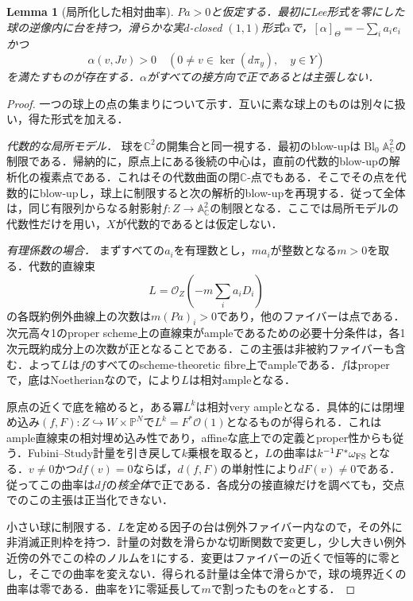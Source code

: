 \documentclass[12pt]{amsart}
\newtheorem{lem}[thm]{Lemma}
\theoremstyle{definition}
\theoremstyle{remark}
\numberwithin{equation}{section}
\newcommand{\cO}{\mathcal{O}}
\newcommand{\C}{\mathbb{C}}
\newcommand{\mP}{\mathbb{P}}
\begin{document}
\begin{lem}[局所化した相対曲率]\label{lem:curvature}
$Pa>0$と仮定する．最初にLee形式を零にした球の逆像内に台を持つ，滑らかな実$d$-closed $(1,1)$形式$\alpha$で，$[\alpha]_\Theta=-\sum_i a_i e_i$かつ
\begin{equation}\label{eq:vertical}
 \alpha(v,Jv)>0\quad(0\ne v\in\ker(d\pi_y),\quad y\in Y)
\end{equation}
を満たすものが存在する．$\alpha$がすべての接方向で正であるとは主張しない．
\end{lem}
\begin{proof}
一つの球上の点の集まりについて示す．互いに素な球上のものは別々に扱い，得た形式を加える．

\emph{代数的な局所モデル．} 球を$\C^2$の開集合と同一視する．最初のblow-upは$\operatorname{Bl}_0\mathbb A^2_\C$の制限である．帰納的に，原点上にある後続の中心は，直前の代数的blow-upの解析化の複素点である．これはその代数曲面の閉$\C$-点でもある．そこでその点を代数的にblow-upし，球上に制限すると次の解析的blow-upを再現する．従って全体は，同じ有限列からなる射影射$f:Z\to\mathbb A^2_\C$の制限となる．ここでは局所モデルの代数性だけを用い，$X$が代数的であるとは仮定しない．

\emph{有理係数の場合．} まずすべての$a_i$を有理数とし，$ma_i$が整数となる$m>0$を取る．代数的直線束
\[
 L=\cO_Z\left(-m\sum_i a_iD_i\right)
\]
の各既約例外曲線上の次数は$m(Pa)_i>0$であり，他のファイバーは点である．次元高々1のproper scheme上の直線束がampleであるための必要十分条件は，各1次元既約成分上の次数が正となることである\cite[Tag 0B5Y]{Stacks}．この主張は非被約ファイバーも含む．よって$L$は$f$のすべてのscheme-theoretic fibre上でampleである．$f$はproperで，底はNoetherianなので，\cite[Theorem 4.7.1, p.~145]{EGA}により$L$は相対ampleとなる．

原点の近くで底を縮めると，ある冪$L^k$は相対very ampleとなる．具体的には閉埋め込み$(f,F):Z\hookrightarrow W\times\mP^N$で$L^k=F^*\cO(1)$となるものが得られる．これはample直線束の相対埋め込み性であり，affineな底上での定義とproper性からも従う．Fubini--Study計量を引き戻して$k$乗根を取ると，$L$の曲率は$k^{-1}F^*\omega_{\rm FS}$となる．$v\ne0$かつ$df(v)=0$ならば，$d(f,F)$の単射性により$dF(v)\ne0$である．従ってこの曲率は$df$の\emph{核全体}で正である．各成分の接直線だけを調べても，交点でのこの主張は正当化できない．

小さい球に制限する．$L$を定める因子の台は例外ファイバー内なので，その外に非消滅正則枠を持つ．計量の対数を滑らかな切断関数で変更し，少し大きい例外近傍の外でこの枠のノルムを1にする．変更はファイバーの近くで恒等的に零とし，そこでの曲率を変えない．得られる計量は全体で滑らかで，球の境界近くの曲率は零である．曲率を$Y$に零延長して$m$で割ったものを$\alpha$とする．


\end{proof}
\end{document}
